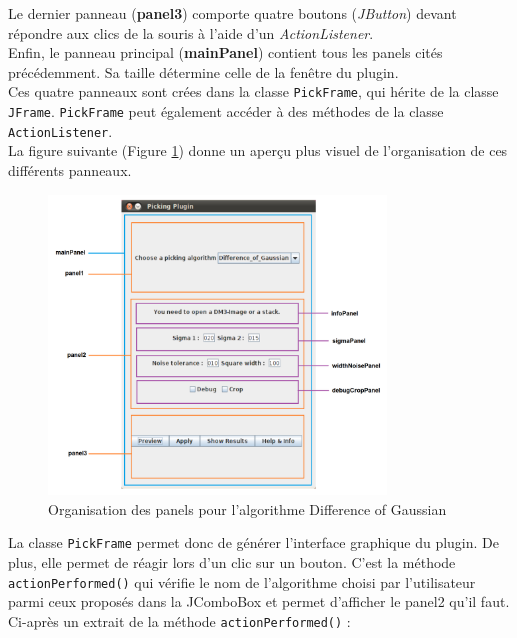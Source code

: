 Le dernier panneau (\textbf{panel3}) comporte quatre boutons (\emph{JButton}) devant répondre aux clics de la souris à l'aide d'un \emph{ActionListener}. \\

Enfin, le panneau principal (\textbf{mainPanel}) contient tous les panels cités précédemment. Sa taille détermine celle de la fenêtre du plugin. \\
Ces quatre panneaux sont crées dans la classe \texttt{PickFrame}, qui hérite de la classe \texttt{JFrame}. \texttt{PickFrame} peut également accéder à des méthodes de la classe \texttt{ActionListener}. \\

La figure suivante (Figure \ref{panneauxDetail}) donne un aperçu plus visuel de l'organisation de ces différents panneaux.
\begin{figure}[!ht] 
\begin{center}
\includegraphics[width=0.8\textwidth]{plugin3-1.png}
\caption{Organisation des panels pour l'algorithme Difference of Gaussian}
\label{panneauxDetail}
\end{center}
\end{figure}
\pagebreak

La classe \texttt{PickFrame} permet donc de générer l'interface graphique du plugin. De plus, elle permet de réagir lors d'un clic sur un bouton. C'est la méthode \texttt{actionPerformed()} qui vérifie le nom de l'algorithme choisi par l'utilisateur parmi ceux proposés dans la JComboBox et permet d'afficher le panel2 qu'il faut. Ci-après un extrait de la méthode \texttt{actionPerformed()} :

